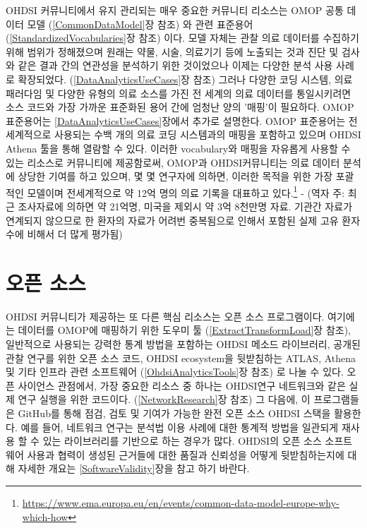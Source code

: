 \documentclass[11pt]{book}
\let\rmarkdownfootnote\footnote%
\def\footnote{\protect\rmarkdownfootnote}
\theoremstyle{definition}
\theoremstyle{definition}
\theoremstyle{definition}
\theoremstyle{remark}
\begin{document}

OHDSI 커뮤니티에서 유지 관리되는 매우 중요한 커뮤니티 리소스는 OMOP 공통
데이터 모델 (\ref{CommonDataModel}장 참조) 와 관련 표준용어
(\ref{StandardizedVocabularies}장 참조) 이다. 모델 자체는 관찰 의료
데이터를 수집하기 위해 범위가 정해졌으며 원래는 약물, 시술, 의료기기
등에 노출되는 것과 진단 및 검사와 같은 결과 간의 연관성을 분석하기 위한
것이었으나 이제는 다양한 분석 사용 사례로 확장되었다.
(\ref{DataAnalyticsUseCases}장 참조) 그러나 다양한 코딩 시스템, 의료
패러다임 및 다양한 유형의 의료 소스를 가진 전 세계의 의료 데이터를
통일시키려면 소스 코드와 가장 가까운 표준화된 용어 간에 엄청난 양의
'매핑'이 필요하다. OMOP 표준용어는 \ref{DataAnalyticsUseCases}장에서
추가로 설명한다. OMOP 표준용어는 전 세계적으로 사용되는 수백 개의 의료
코딩 시스템과의 매핑을 포함하고 있으며 OHDSI Athena 툴을 통해 열람할 수
있다. 이러한 vocabulary와 매핑을 자유롭게 사용할 수 있는 리소스로
커뮤니티에 제공함로써, OMOP과 OHDSI커뮤니티는 의료 데이터 분석에 상당한
기여를 하고 있으며, 몇 몇 연구자에 의하면, 이러한 목적을 위한 가장
포괄적인 모델이며 전세계적으로 약 12억 명의 의료 기록을 대표하고
있다.\footnote{\url{https://www.ema.europa.eu/en/events/common-data-model-europe-why-which-how}}
\citep{garza_2016} - (역자 주: 최근 조사자료에 의하면 약 21억명, 미국을
제외시 약 3억 8천만명 자료. 기관간 자료가 연계되지 않으므로 한 환자의
자료가 어려번 중복됨으로 인해서 포함된 실제 고유 환자 수에 비해서 더
많게 평가됨)

\section{오픈 소스}\label{-}


OHDSI 커뮤니티가 제공하는 또 다른 핵심 리소스는 오픈 소스 프로그램이다.
여기에는 데이터를 OMOP에 매핑하기 위한 도우미 툴
(\ref{ExtractTransformLoad}장 참조), 일반적으로 사용되는 강력한 통계
방법을 포함하는 OHDSI 메소드 라이브러리, 공개된 관찰 연구를 위한 오픈
소스 코드, OHDSI ecosystem을 뒷받침하는 ATLAS, Athena 및 기타 인프라
관련 소프트웨어 (\ref{OhdsiAnalyticsTools}장 참조) 로 나눌 수 있다. 오픈
사이언스 관점에서, 가장 중요한 리소스 중 하나는 OHDSI연구 네트워크와
같은 실제 연구 실행을 위한 코드이다. (\ref{NetworkResearch}장 참조) 그
다음에, 이 프로그램들은 GitHub를 통해 점검, 검토 및 기여가 가능한 완전
오픈 소스 OHDSI 스택을 활용한다. 예를 들어, 네트워크 연구는 분석법 이용
사례에 대한 통계적 방법을 일관되게 재사용 할 수 있는 라이브러리를
기반으로 하는 경우가 많다. OHDSI의 오픈 소스 소프트웨어 사용과 협력이
생성된 근거들에 대한 품질과 신뢰성을 어떻게 뒷받침하는지에 대해 자세한
개요는 \ref{SoftwareValidity}장을 참고 하기 바란다.
\end{document}
